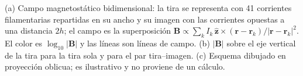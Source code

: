 \documentclass[11pt,letterpaper]{article}
\begin{document}
\begin{description}[style=nextline,leftmargin=0pt,itemsep=4pt,font=\normalfont\bfseries]
\item[Figura~\ref{fig:imagen} (tira e imagen)]
(a) Campo magnetostático bidimensional: la tira se representa con 41 corrientes filamentarias repartidas en su ancho y su imagen con las corrientes opuestas a una distancia $2h$; el campo es la superposición $\mathbf{B}\propto\sum_k I_k\,\hat{\mathbf{z}}\times(\mathbf{r}-\mathbf{r}_k)/|\mathbf{r}-\mathbf{r}_k|^2$. El color es $\log_{10}|\mathbf{B}|$ y las líneas son líneas de campo.
(b) $|\mathbf{B}|$ sobre el eje vertical de la tira para la tira sola y para el par tira--imagen.
(c) Esquema dibujado en proyección oblicua; es ilustrativo y no proviene de un cálculo.

\end{description}
\end{document}
